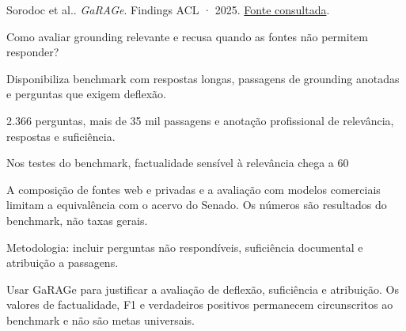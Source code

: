 {\small Sorodoc et al.. \textit{GaRAGe}. Findings ACL · 2025. \href{https://aclanthology.org/2025.findings-acl.875/}{Fonte consultada}.\par}

Como avaliar grounding relevante e recusa quando as fontes não permitem responder?

Disponibiliza benchmark com respostas longas, passagens de grounding anotadas e perguntas que exigem deflexão.

2.366 perguntas, mais de 35 mil passagens e anotação profissional de relevância, respostas e suficiência.

Nos testes do benchmark, factualidade sensível à relevância chega a 60%

\begin{itemize}
\end{itemize}

A composição de fontes web e privadas e a avaliação com modelos comerciais limitam a equivalência com o acervo do Senado. Os números são resultados do benchmark, não taxas gerais.

Metodologia: incluir perguntas não respondíveis, suficiência documental e atribuição a passagens.

Usar GaRAGe para justificar a avaliação de deflexão, suficiência e atribuição. Os valores de factualidade, F1 e verdadeiros positivos permanecem circunscritos ao benchmark e não são metas universais.

